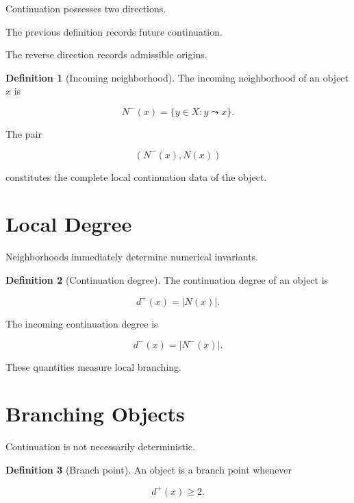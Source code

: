 \documentclass[13pt,openany]{book}
\theoremstyle{plain}
\theoremstyle{definition}
\newtheorem{definition}{Definition}[chapter]
\begin{document}
Continuation possesses two directions.

The previous definition records future continuation.

The reverse direction records admissible origins.

\begin{definition}[Incoming neighborhood]

The incoming neighborhood of an object $x$ is

\[
N^{-}(x)
=
\{
y\in X:
y\leadsto x
\}.
\]

\end{definition}

The pair

\[
(N^{-}(x),N(x))
\]

constitutes the complete local continuation data of the object.


\section{Local Degree}

Neighborhoods immediately determine numerical invariants.

\begin{definition}[Continuation degree]

The continuation degree of an object is

\[
d^{+}(x)
=
|N(x)|.
\]

The incoming continuation degree is

\[
d^{-}(x)
=
|N^{-}(x)|.
\]

\end{definition}

These quantities measure local branching.


\section{Branching Objects}

Continuation is not necessarily deterministic.

\begin{definition}[Branch point]

An object is a branch point whenever

\[
d^{+}(x)\ge2.
\]

\end{definition}
\end{document}
